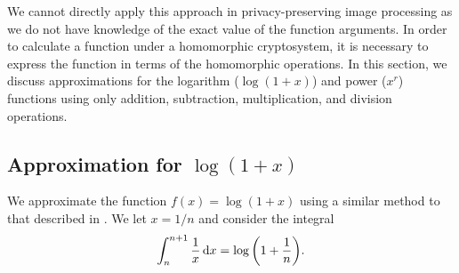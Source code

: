 We cannot directly apply this approach in privacy-preserving image processing as we do not have knowledge of the exact value of the function arguments. In order to calculate a function under a  homomorphic cryptosystem, it is necessary to express the function in terms of the homomorphic operations.
In this section, we discuss approximations for the logarithm ($\log(1+x)$) and power ($x^r$) functions using only addition, subtraction, multiplication, and division operations.

\subsection{Approximation for $\log(1+x)$}
\label{sec:logapproximation}
We approximate the function $f(x)=\log(1+x)$ using a similar method to that described in
\cite{khattri_new_2009}.
We let $x = 1/n$ and consider the integral
\begin{equation}
	\label{eq:log_integral}
  	\int_{n}^{n+1}{\frac{1}{x}\mathop{}\!\mathrm{d} x}=\log{\left(1+\frac{1}{n}\right)}.
\end{equation}

